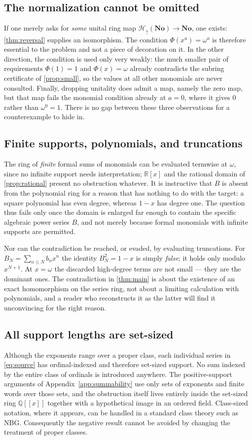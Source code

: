 \documentclass[11pt,letterpaper]{article}
\theoremstyle{definition}
\theoremstyle{remark}
\newcommand{\No}{\mathbf{No}}
\newcommand{\R}{\mathbb R}
\newcommand{\Q}{\mathbb Q}
\newcommand{\Hfull}{\mathcal H_{\uparrow}(\No)}
\begin{document}
\subsection{The normalization cannot be omitted}
If one merely asks for \emph{some} unital ring map $\Hfull\to\No$, one exists:
\cref{thm:reversal} supplies an isomorphism. The condition
$\Phi(x^a)=\omega^a$ is therefore essential to the problem and not a piece of
decoration on it. In the other direction, the condition is used only very
weakly: the much smaller pair of requirements $\Phi(1)=1$ and
$\Phi(x)=\omega$ already contradicts the subring certificate of
\cref{prop:small}, so the values at all other monomials are never consulted.
Finally, dropping unitality does admit a map, namely the zero map, but that
map fails the monomial condition already at $a=0$, where it gives $0$ rather
than $\omega^0=1$. There is no gap between these three observations for a
counterexample to hide in.

\subsection{Finite supports, polynomials, and truncations}
The ring of \emph{finite} formal sums of monomials can be evaluated termwise
at $\omega$, since no infinite support needs interpretation; $\R[x]$ and the
rational domain of \cref{prop:rational} present no obstruction whatever. It is
instructive that $B$ is absent from the polynomial ring for a reason that has
nothing to do with the target: a square polynomial has even degree, whereas
$1-x$ has degree one. The question thus fails only once the domain is enlarged
far enough to contain the specific algebraic power series $B$, and not merely
because formal monomials with infinite supports are permitted.

Nor can the contradiction be reached, or evaded, by evaluating truncations.
For $B_N=\sum_{n\le N}b_nx^n$ the identity $B_N^2=1-x$ is simply
\emph{false}; it holds only modulo $x^{N+1}$. At $x=\omega$ the discarded
high-degree terms are not small --- they are the dominant ones. The
contradiction in \cref{thm:main} is about the existence of an exact
homomorphism on the series ring, not about a limiting calculation with
polynomials, and a reader who reconstructs it as the latter will find it
unconvincing for the right reason.

\subsection{All support lengths are set-sized}
Although the exponents range over a proper class, each individual series in
\eqref{eq:source} has ordinal-indexed and therefore set-sized support. No sum
indexed by the entire class of ordinals is introduced anywhere. The
positive-support arguments of Appendix~\ref{app:summability} use only sets of
exponents and finite words over those sets, and the obstruction itself lives
entirely inside the set-sized ring $\Q[[x]]$ together with a hypothetical
image in an ordered field. Class-sized notation, where it appears, can be
handled in a standard class theory such as NBG. Consequently the negative
result cannot be avoided by changing the treatment of proper classes.
\end{document}
